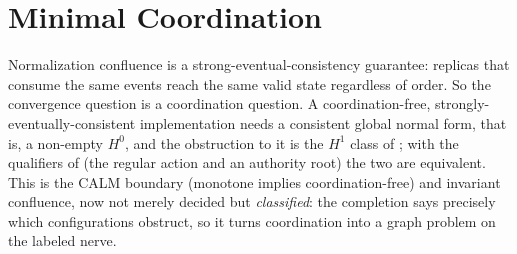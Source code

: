\documentclass[11pt,a4paper]{article}
\theoremstyle{plain}
\theoremstyle{definition}
\theoremstyle{remark}
\newcommand{\Hz}{H^0}
\newcommand{\Ho}{H^1}
\renewcommand{\_}{\origunderscore\allowbreak}
\begin{document}
\section{Minimal Coordination}
\label{sec:minimal}

Normalization confluence is a strong-eventual-consistency guarantee: replicas that consume the same
events reach the same valid state regardless of order. So the convergence question is a coordination
question. A coordination-free, strongly-eventually-consistent implementation needs a consistent
global normal form, that is, a non-empty $\Hz$, and the obstruction to it is the $\Ho$ class of
; with the qualifiers of  (the regular action and an
authority root) the two are equivalent. This is the CALM boundary (monotone implies
coordination-free) and invariant confluence, now not merely decided but \emph{classified}: the
completion says precisely which configurations obstruct, so it turns coordination into a graph
problem on the labeled nerve.
\end{document}
